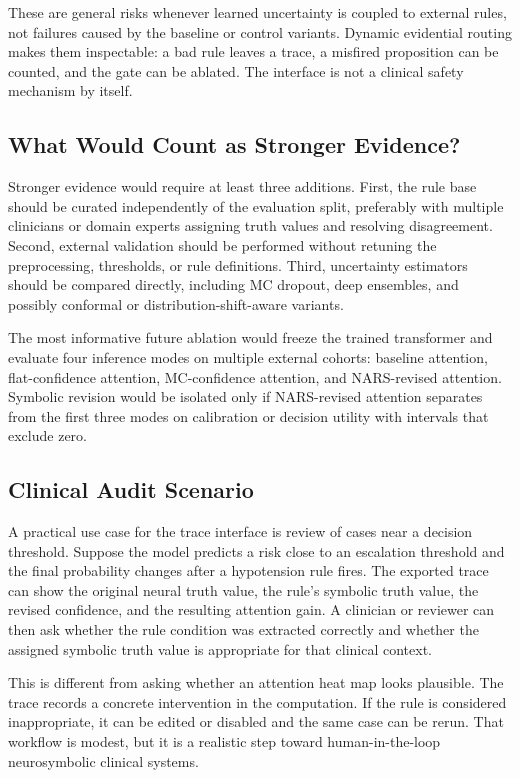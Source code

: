\documentclass[final]{nesy2026}
\begin{document}
These are general risks whenever learned uncertainty is coupled to external rules, not failures caused by the baseline or control variants. Dynamic evidential routing makes them inspectable: a bad rule leaves a trace, a misfired proposition can be counted, and the gate can be ablated. The interface is not a clinical safety mechanism by itself.

\subsection{What Would Count as Stronger Evidence?}

Stronger evidence would require at least three additions. First, the rule base should be curated independently of the evaluation split, preferably with multiple clinicians or domain experts assigning truth values and resolving disagreement. Second, external validation should be performed without retuning the preprocessing, thresholds, or rule definitions. Third, uncertainty estimators should be compared directly, including MC dropout, deep ensembles, and possibly conformal or distribution-shift-aware variants.

The most informative future ablation would freeze the trained transformer and evaluate four inference modes on multiple external cohorts: baseline attention, flat-confidence attention, MC-confidence attention, and NARS-revised attention. Symbolic revision would be isolated only if NARS-revised attention separates from the first three modes on calibration or decision utility with intervals that exclude zero.

\subsection{Clinical Audit Scenario}

A practical use case for the trace interface is review of cases near a decision threshold. Suppose the model predicts a risk close to an escalation threshold and the final probability changes after a hypotension rule fires. The exported trace can show the original neural truth value, the rule's symbolic truth value, the revised confidence, and the resulting attention gain. A clinician or reviewer can then ask whether the rule condition was extracted correctly and whether the assigned symbolic truth value is appropriate for that clinical context.

This is different from asking whether an attention heat map looks plausible. The trace records a concrete intervention in the computation. If the rule is considered inappropriate, it can be edited or disabled and the same case can be rerun. That workflow is modest, but it is a realistic step toward human-in-the-loop neurosymbolic clinical systems.
\end{document}
